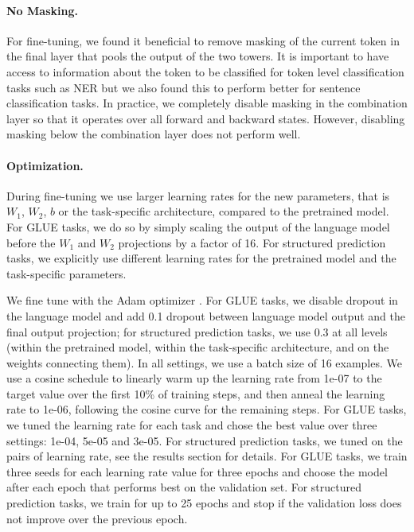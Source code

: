 \documentclass[11pt,a4paper]{article}
\begin{document}
\paragraph{No Masking.}
For fine-tuning, we found it beneficial to remove masking of the current token in the final layer that pools the output of the two towers. 
It is important to have access to information about the token to be classified for token level classification tasks such as NER but we also found this to perform better for sentence classification tasks. 
In practice, we completely disable masking in the combination layer so that it operates over all forward and backward states. However, disabling masking below the combination layer does not perform well.


\paragraph{Optimization.}
During fine-tuning we use larger learning rates for the new parameters, that is $W_1$, $W_2$, $b$ or the task-specific architecture, compared to the pretrained model.
For GLUE tasks, we do so by simply scaling the output of the language model before the $W_1$ and $W_2$ projections by a factor of 16. 
For structured prediction tasks, we explicitly use different learning rates for the pretrained model and the task-specific parameters.

We fine tune with the Adam optimizer \citep{kingma2015adam}. 
For GLUE tasks, we disable dropout in the language model and add 0.1 dropout between language model output and the final output projection; for structured prediction tasks, we use 0.3 at all levels (within the pretrained model, within the task-specific architecture, and on the weights connecting them).
In all settings, we use a batch size of 16 examples.
We use a cosine schedule to  linearly warm up the learning rate from 1e-07 to the target value over the first 10\% of training steps, and then anneal the learning rate to 1e-06, following the cosine curve for the remaining steps.
For GLUE tasks, we tuned the learning rate for each task and chose the best value over three settings: 1e-04, 5e-05 and 3e-05. 
For structured prediction tasks, we tuned on the pairs of learning rate, see the results section for details.  
For GLUE tasks, we train three seeds for each learning rate value for three epochs and choose the model after each epoch that performs best on the validation set. 
For structured prediction tasks, we train for up to 25 epochs and stop if the validation loss does not improve over the previous epoch.
\end{document}
